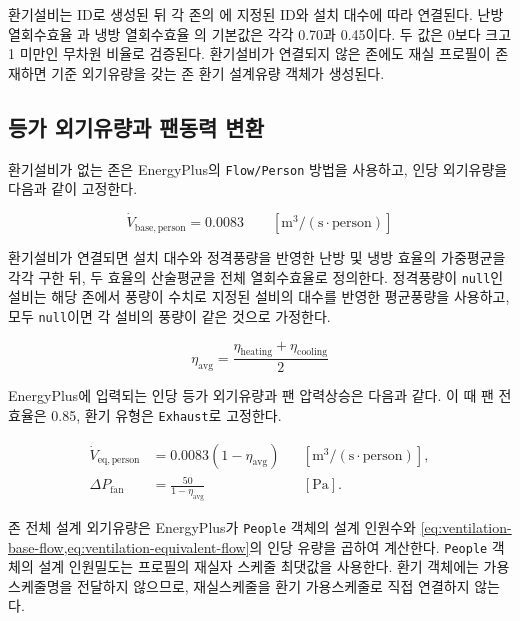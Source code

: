 환기설비는 ID로 생성된 뒤 각 존의 에 지정된 ID와 설치 대수에 따라 연결된다. 난방 열회수효율 과 냉방 열회수효율 의 기본값은 각각 0.70과 0.45이다. 두 값은 0보다 크고 1 미만인 무차원 비율로 검증된다. 환기설비가 연결되지 않은 존에도 재실 프로필이 존재하면 기준 외기유량을 갖는 존 환기 설계유량 객체가 생성된다.

\subsection{등가 외기유량과 팬동력 변환}

환기설비가 없는 존은 EnergyPlus의 \texttt{Flow/Person} 방법을 사용하고, 인당 외기유량을 다음과 같이 고정한다.

\begin{equation}
  \dot V_{\mathrm{base,person}} = 0.0083 \qquad [\mathrm{m^3/(s\cdot person)}]
  \label{eq:ventilation-base-flow}
\end{equation}

환기설비가 연결되면 설치 대수와 정격풍량을 반영한 난방 및 냉방 효율의 가중평균을 각각 구한 뒤, 두 효율의 산술평균을 전체 열회수효율로 정의한다. 정격풍량이 \texttt{null}인 설비는 해당 존에서 풍량이 수치로 지정된 설비의 대수를 반영한 평균풍량을 사용하고, 모두 \texttt{null}이면 각 설비의 풍량이 같은 것으로 가정한다.

\begin{equation}
  \eta_{\mathrm{avg}} = \frac{\eta_{\mathrm{heating}}+\eta_{\mathrm{cooling}}}{2}
  \label{eq:ventilation-average-efficiency}
\end{equation}

EnergyPlus에 입력되는 인당 등가 외기유량과 팬 압력상승은 다음과 같다. 이 때 팬 전효율은 0.85, 환기 유형은 \texttt{Exhaust}로 고정한다. 

\begin{align}
  \dot V_{\mathrm{eq,person}} &= 0.0083\left(1-\eta_{\mathrm{avg}}\right)
  && [\mathrm{m^3/(s\cdot person)}],
  \label{eq:ventilation-equivalent-flow} \\
  \Delta P_{\mathrm{fan}} &= \frac{50}{1-\eta_{\mathrm{avg}}}
  && [\mathrm{Pa}].
  \label{eq:ventilation-fan-pressure}
\end{align}

존 전체 설계 외기유량은 EnergyPlus가 \texttt{People} 객체의 설계 인원수와 \cref{eq:ventilation-base-flow,eq:ventilation-equivalent-flow}의 인당 유량을 곱하여 계산한다. \texttt{People} 객체의 설계 인원밀도는 프로필의 재실자 스케줄 최댓값을 사용한다. 환기 객체에는 가용스케줄명을 전달하지 않으므로,  재실스케줄을 환기 가용스케줄로 직접 연결하지 않는다.

